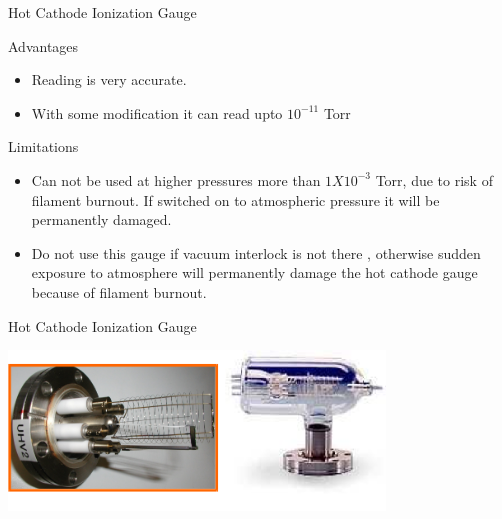\documentclass[11pt]{beamer}
\begin{document}
\begin{frame}{Hot Cathode Ionization Gauge}

\begin{block}{Advantages }
          \begin{itemize}
          \item Reading is very accurate. 
          \item With some modification it can read upto $ 10^{-11} $ Torr
          \end{itemize}
       
       \end{block}  

\begin{block}{Limitations}
          \begin{itemize}
          \item Can not be used at higher pressures more than $1X10^{-3}$ Torr, due to risk of filament burnout. If switched on to atmospheric pressure it will be permanently damaged. 
          \item Do not use this gauge if vacuum interlock is not there , otherwise sudden exposure to atmosphere will permanently damage the hot cathode gauge because of filament burnout. 
          
          \end{itemize}
       
       \end{block}  



\end{frame}

\begin{frame}{Hot Cathode Ionization Gauge}

       \begin{center}
			\includegraphics[width=0.75\textwidth]{TwoTypesOfHCIG.png}
		\end{center} 

\end{frame}
\end{document}
